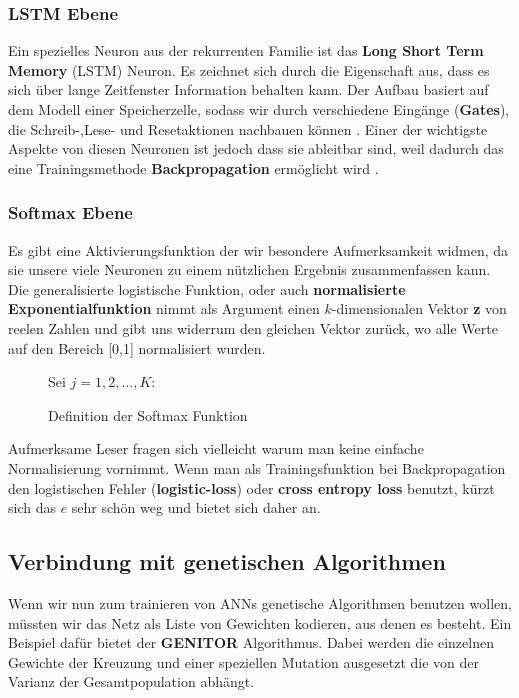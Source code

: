             \subsubsection*{LSTM Ebene}
                Ein spezielles Neuron aus der rekurrenten Familie ist das \textbf{Long Short Term Memory} (LSTM) Neuron\cite{lstm}. Es zeichnet sich durch die Eigenschaft aus, dass es sich über lange Zeitfenster Information behalten kann. Der Aufbau basiert auf dem Modell einer Speicherzelle, sodass wir durch verschiedene Eingänge (\textbf{Gates}), die Schreib-,Lese- und Resetaktionen nachbauen können \cite{lstm-new}. Einer der wichtigste Aspekte von diesen Neuronen ist jedoch dass sie ableitbar sind, weil dadurch das eine Trainingsmethode \textbf{Backpropagation} ermöglicht wird \cite{backprop}.

            \subsubsection*{Softmax Ebene}
                Es gibt eine Aktivierungsfunktion der wir besondere Aufmerksamkeit widmen, da sie unsere viele Neuronen zu einem nützlichen Ergebnis zusammenfassen kann. Die generalisierte logistische Funktion, oder auch \textbf{normalisierte Exponentialfunktion} nimmt als Argument einen $k$-dimensionalen Vektor \textbf{z} von reelen Zahlen und gibt uns widerrum den gleichen Vektor zurück, wo alle Werte auf den Bereich [0,1] normalisiert wurden.

            \begin{figure}[H]
                \begin{mdframed}
                    Sei $j = 1,2,...,K$: \\
                    \hspace*{45mm} 
                \end{mdframed}
                \caption{\label{softmax} Definition der Softmax Funktion}
            \end{figure}

            \noindent
            Aufmerksame Leser fragen sich vielleicht warum man keine einfache Normalisierung vornimmt. Wenn man als Trainingsfunktion bei Backpropagation den logistischen Fehler (\textbf{logistic-loss}) oder \textbf{cross entropy loss} benutzt, kürzt sich das $e$ sehr schön weg und bietet sich daher an.

        \subsection{Verbindung mit genetischen Algorithmen}
            Wenn wir nun zum trainieren von ANNs genetische Algorithmen benutzen wollen, müssten wir das Netz als Liste von Gewichten kodieren, aus denen es besteht. Ein Beispiel dafür bietet der \textbf{GENITOR}\cite{moriarty1999evolutionary} Algorithmus. Dabei werden die einzelnen Gewichte der Kreuzung und einer speziellen Mutation ausgesetzt die von der Varianz der Gesamtpopulation abhängt. \\

